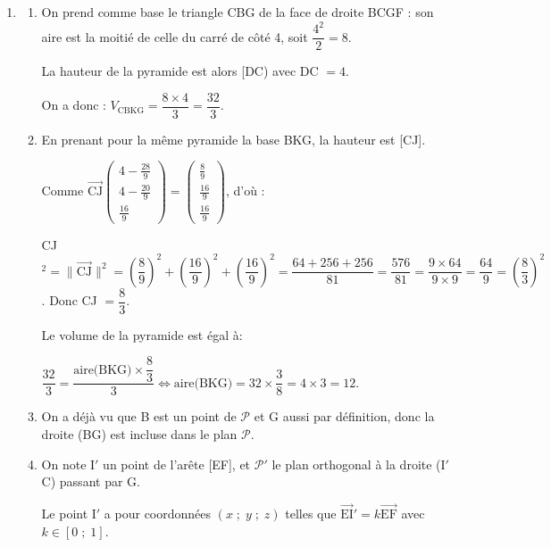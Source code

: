 \documentclass[10pt]{article}
\providecommand{\vect}[1]{\overrightarrow{#1}}
\providecommand{\vectt}[1]{\overrightarrow{\mathrm{#1}}}
\begin{document}
\begin{enumerate}
\begin{enumerate}
Conclusion : les deux points B et K sont communs aux deux plans, donc l'intersection des plans $\mathcal{P}$ et (ABC) est la droite (BK).
	\end{enumerate}
	
\item 
	\begin{enumerate}
		\item 
		On prend comme base le triangle CBG de la face de droite BCGF  : son aire est la moitié de celle du carré de côté 4, soit $\dfrac{4^2}{2} = 8$.
		
La hauteur de la pyramide est alors [DC) avec DC $= 4$.

On a donc : $V_{\text{CBKG}} = \dfrac{8 \times 4}{3} = \dfrac{32}{3}$.
		\item 
En prenant pour la même pyramide la base BKG, la hauteur est [CJ].
		
Comme $\vect{\text{CJ}}\begin{pmatrix}4 - \frac{28}{9}\\4 - \frac{20}{9}\\ \frac{16}{9}\end{pmatrix} = \begin{pmatrix}\frac89\\\frac{16}{9}\\\frac{16}{9} \end{pmatrix}$, d'où :
		
CJ$^2 = \|\vect{\text{CJ}}\|^2 = \left(\dfrac89\right)^2 + \left(\dfrac{16}{9}\right)^2  + \left(\dfrac{16}{9}\right)^2 = \dfrac{64 + 256 + 256}{81} = \dfrac{576}{81} = \dfrac{9 \times 64}{9 \times 9} = \dfrac{64}{9} = \left(\dfrac83\right)^2$. Donc CJ $= \dfrac83$.

Le volume de la pyramide est égal à:

$\dfrac{32}{3} = \dfrac{\text{aire(BKG)} \times \dfrac83}{3} \iff \text{aire(BKG)} = 32 \times \dfrac38 = 4 \times 3 = 12$.

		\item 
		On a déjà vu que B est un point de $\mathcal{P}$ et G aussi par définition, donc la droite (BG) est incluse dans le plan $\mathcal{P}$.

		\item On note I$'$ un point de l'arête [EF], et $\mathcal{P}'$ le plan orthogonal à la droite (I$'$C) passant par G.
		


Le point I$'$ a pour coordonnées $(x\;;\;y\;;\;z)$ telles que 
$\vectt{EI}' = k\vectt{EF}$ avec $k\in [0\;;\;1]$.


\end{enumerate}
\end{enumerate}
\end{document}
